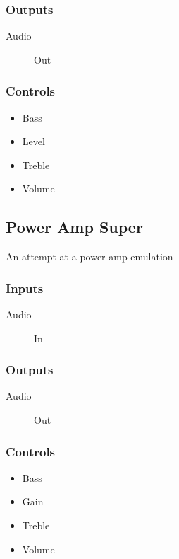 \subsubsection{Outputs}
\begin{description}
\item [Audio] Out
\end{description}

\subsubsection{Controls}
\begin{itemize}
\item Bass
\item Level
\item Treble
\item Volume
\end{itemize}

\subsection{Power Amp Super}

An attempt at a power amp emulation



\subsubsection{Inputs}
\begin{description}
\item [Audio] In
\end{description}

\subsubsection{Outputs}
\begin{description}
\item [Audio] Out
\end{description}

\subsubsection{Controls}
\begin{itemize}
\item Bass
\item Gain
\item Treble
\item Volume
\end{itemize}

